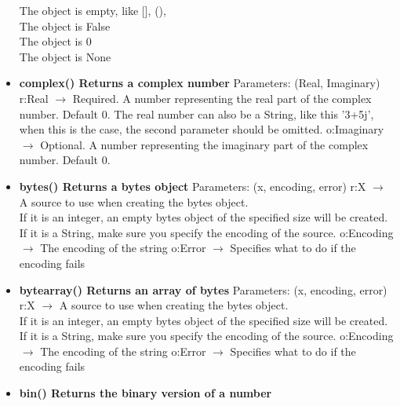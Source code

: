 \documentclass{report}
\begin{document}
\begin{itemize}
          The object is empty, like [], (), {} \\
          The object is False \\
          The object is 0 \\
          The object is None
          \smallbreak \noindent
        \item[\ding{43}] \textbf{complex() Returns a complex number}
          \smallbreak \noindent
          Parameters: (Real, Imaginary)
          \smallbreak \noindent
          r:Real $\rightarrow$ Required. A number representing the real part of the complex number. Default 0. The real number can also be a String, like this '3+5j', when this is the case, the second parameter should be omitted.
          \smallbreak \noindent
          o:Imaginary $\rightarrow$ Optional. A number representing the imaginary part of the complex number. Default 0.
          \smallbreak \noindent
        \item[\ding{43}] \textbf{bytes() Returns a bytes object}
          \smallbreak \noindent
          Parameters: (x, encoding, error)
          \smallbreak \noindent
          r:X $\rightarrow$ A source to use when creating the bytes object. \\
          If it is an integer, an empty bytes object of the specified size will be created. \\
          If it is a String, make sure you specify the encoding of the source.
          \smallbreak \noindent
          o:Encoding $\rightarrow$ 	The encoding of the string
          \smallbreak \noindent
          o:Error $\rightarrow$ Specifies what to do if the encoding fails
          \smallbreak \noindent
        \item[\ding{43}] \textbf{bytearray() Returns an array of bytes}
          \smallbreak \noindent
          Parameters: (x, encoding, error)
          \smallbreak \noindent
          r:X $\rightarrow$ A source to use when creating the bytes object. \\
          If it is an integer, an empty bytes object of the specified size will be created. \\
          If it is a String, make sure you specify the encoding of the source.
          \smallbreak \noindent
          o:Encoding $\rightarrow$ 	The encoding of the string
          \smallbreak \noindent
          o:Error $\rightarrow$ Specifies what to do if the encoding fails
          \smallbreak \noindent
        \item[\ding{43}] \textbf{bin()	Returns the binary version of a number}

\end{itemize}
\end{document}
